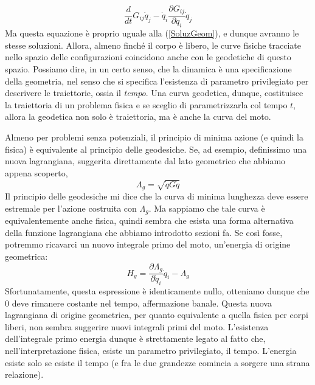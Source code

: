 \documentclass[a4paper,openany]{article}
\begin{document}
	$$
	\dfrac{d}{dt}G_{ij} \dot{q}_j - \dot{q}_i \frac{\partial G_{ij}}{\partial q_i} \dot{q}_j
	$$
	Ma questa equazione è proprio uguale alla (\ref{SoluzGeom}), e dunque avranno le stesse soluzioni. Allora, almeno finché il corpo è libero, le curve fisiche tracciate nello spazio delle configurazioni coincidono anche con le geodetiche di questo spazio. Possiamo dire, in un certo senso, che la dinamica è una specificazione della geometria, nel senso che si specifica l'esistenza di parametro privilegiato per descrivere le traiettorie, ossia il \textit{tempo}. Una curva geodetica, dunque, costituisce la traiettoria di un problema fisica e se sceglio di parametrizzarla col tempo $t$, allora la geodetica non solo è traiettoria, ma è anche la curva del moto.
	
	
	Almeno per problemi senza potenziali, il principio di minima azione (e quindi la fisica) è equivalente al principio delle geodesiche. Se, ad esempio, definissimo una nuova lagrangiana, suggerita direttamente dal lato geometrico che abbiamo appena scoperto,
	\begin{equation}\label{key}
		\Lambda_{g} = \sqrt{\dot{q}G\dot{q}}
	\end{equation}
	Il principio delle geodesiche mi dice che la curva di minima lunghezza deve essere estremale per l'azione costruita con $\Lambda_g$. Ma sappiamo che tale curva è equivalentemente anche fisica, quindi sembra che esista una forma alternativa della funzione lagrangiana che abbiamo introdotto sezioni fa. Se così fosse, potremmo ricavarci un nuovo integrale primo del moto, un'energia di origine geometrica:
	\begin{equation}\label{key}
		H_{g} = \dfrac{\partial \Lambda_g}{\partial \dot{q}_i}\dot{q}_i - \Lambda_g
	\end{equation}
	Sfortunatamente, questa espressione è identicamente nullo, otteniamo dunque che $0$ deve rimanere costante nel tempo, affermazione banale. Questa nuova lagrangiana di origine geometrica, per quanto equivalente a quella fisica per corpi liberi, non sembra suggerire nuovi integrali primi del moto. L'esistenza dell'integrale primo energia dunque è strettamente legato al fatto che, nell'interpretazione fisica, esiste un parametro privilegiato, il tempo. L'energia esiste solo se esiste il tempo (e fra le due grandezze comincia a sorgere una strana relazione).
\end{document}
